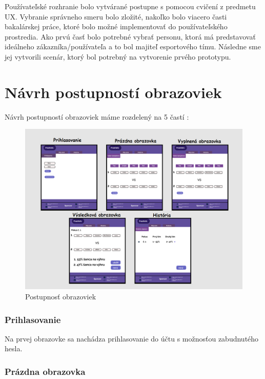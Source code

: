 Používateľské rozhranie bolo vytvárané postupne s pomocou cvičení z predmetu UX. Vybranie správneho smeru bolo zložité, nakoľko bolo viacero časti bakalárskej práce, ktoré bolo možné implementovať do používateľského prostredia. Ako prvú časť bolo potrebné vybrať personu, ktorá má predstavovať ideálneho zákazníka/používateľa a to bol majiteľ esportového tímu. Následne sme jej vytvorili scenár, ktorý bol potrebný na vytvorenie prvého prototypu. 



\section{Návrh postupností obrazoviek}

Návrh postupností obrazoviek máme rozdelený na 5 častí :



\begin{figure}[h!]
	
	\includegraphics[width=.9\textwidth]{figures/postupnost}
	
	\centering
	
	\caption{ Postupnosť obrazoviek \label{jednanula}}
	
\end{figure}



\subsubsection{Prihlasovanie}

Na prvej obrazovke sa nachádza prihlasovanie do účtu s možnosťou zabudnutého hesla.

\subsubsection{Prázdna obrazovka}

